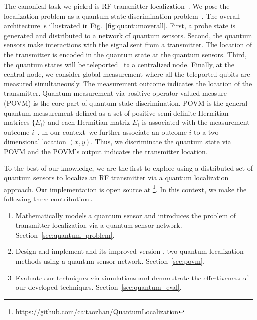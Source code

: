 The canonical task we picked is RF transmitter localization~\cite{nsdi13-arraytrack,pmc22-deepmtlpro}.
We pose the localization problem as a quantum state discrimination problem~\cite{bergou-review-2007}. 
The overall architecture is illustrated in Fig.~\ref{fig:quantumoverall}.
First, a probe state is generated and distributed to a network of quantum sensors.
Second, the quantum sensors make interactions with the signal sent from a transmitter. 
The location of the transmitter is encoded in the quantum state at the quantum sensors.
Third, the quantum states will be teleported~\cite{ton22-quantum} to a centralized node.
Finally, at the central node, we consider global measurement where all the teleported qubits are measured simultaneously. 
The measurement outcome indicates the location of the transmitter.
Quantum measurement via positive operator-valued measure (POVM) is the core part of quantum state discrimination.
POVM is the general quantum measurement defined as a set of positive semi-definite Hermitian matrices $\{E_i\}$ and each Hermitian matrix $E_i$ is associated with the measurement outcome $i$~\cite{qcqi-book}.
In our context, we further associate an outcome $i$ to a two-dimensional location $(x, y)$.
Thus, we discriminate the quantum state via POVM and the POVM's output indicates the transmitter location.


To the best of our knowledge, we are the first to explore using a distributed set of quantum sensors to localize an RF transmitter via a quantum localization approach. 
Our implementation is open source at \footnote{\url{https://github.com/caitaozhan/QuantumLocalization}}.
In this context, we make the following three contributions.
\begin{enumerate}
    \item Mathematically models a quantum sensor and introduces the problem of transmitter localization via a quantum sensor network. Section~\ref{sec:quantum_problem}.
    \item Design and implement \povm and its improved version \povmpro, two quantum localization methods using a quantum sensor network. Section~\ref{sec:povm}.
    \item Evaluate our techniques via simulations and demonstrate the effectiveness of our developed techniques. Section~\ref{sec:quantum_eval}.
\end{enumerate}
